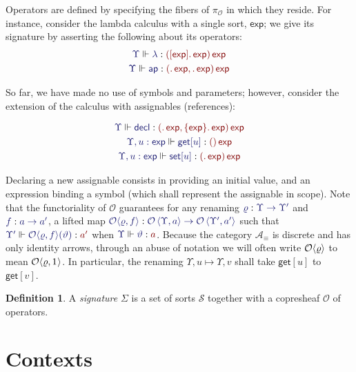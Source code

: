 \documentclass[11pt]{article}
\theoremstyle{definition}
\newtheorem{definition}[thm]{Definition}
\theoremstyle{remark}
\numberwithin{equation}{section}
\def\IModeColorName{MidnightBlue}
\def\OModeColorName{Maroon}
\newcommand\IMode[1]{{\color{\IModeColorName}{#1}}}
\newcommand\OMode[1]{{\color{\OModeColorName}{#1}}}
\newcommand\Of[2]{\IMode{#1}: \IMode{#2}}
\newcommand\MkValence[3]{%
  \ifthenelse{\equal{#1}{}}{}{%
    \{#1\}%
  }%
  \ifthenelse{\equal{#2}{}}{}{%
    [#2]%
  }.\, #3%
}
\newcommand\MkArity[2]{(#1)\, #2}
\newcommand\ArrId[1]{1_{#1}}
\newcommand\Sorts{\mathcal{S}}
\newcommand\Arities{\mathcal{A}}
\newcommand\Operators{\mathcal{O}}
\newcommand\Discrete[1]{#1_{\equiv}}
\newcommand\IsOperator[3]{\IMode{#1}\Vdash\IMode{#2}: \OMode{#3}}
\newcommand\Pair[2]{\left\langle#1, #2 \right\rangle}
\newcommand\FLift[2]{
  \Operators\langle#1%
  \ifthenelse{\equal{#2}{}}{}{, #2}\rangle%
}
\newcommand\SortExp{\mathsf{exp}}
\begin{document}
Operators are defined by specifying the fibers of $\pi_{\Operators}$ in which
they reside. For instance, consider the lambda calculus with a single sort,
$\SortExp$; we give its signature by asserting the following about its
operators:
\begin{gather*}
  \IsOperator{\Upsilon}{\lambda}{
    \MkArity{\MkValence{}{\SortExp}{\SortExp}}{\SortExp}
  }\\
  \IsOperator{\Upsilon}{\mathsf{ap}}{
    \MkArity{
      \MkValence{}{}{\SortExp},
      \MkValence{}{}{\SortExp}
    }{\SortExp}
  }
\end{gather*}

So far, we have made no use of symbols and parameters; however, consider the
extension of the calculus with assignables (references):

\begin{gather*}
  \IsOperator{\Upsilon}{\mathsf{decl}}{
    \MkArity{
      \MkValence{}{}{\SortExp},
      \MkValence{\SortExp}{}{\SortExp}
    }{
      \SortExp
    }
  }\\
  \IsOperator{\Upsilon,u:\SortExp}{\mathsf{get}[u]}{
    \MkArity{}{\SortExp}
  }\\
  \IsOperator{\Upsilon,u:\SortExp}{\mathsf{set}[u]}{
    \MkArity{
      \MkValence{}{}{\SortExp}
    }{
      \SortExp
    }
  }
\end{gather*}

Declaring a new assignable consists in providing an initial value, and an
expression binding a symbol (which shall represent the assignable in scope).
Note that the functoriality of $\Operators$ guarantees for any renaming
$\Of{\varrho}{\Upsilon\to\Upsilon'}$ and $\Of{f}{a\to a'}$, a lifted map
$\Of{\FLift{\varrho}{f}}{\Operators\Pair{\Upsilon}{a}\to\Operators\Pair{\Upsilon'}{a'}}$
such that $\IsOperator{\Upsilon'}{\FLift{\varrho}{f}(\vartheta)}{a'}$ when
$\IsOperator{\Upsilon}{\vartheta}{a}$. Because the category
$\Discrete{\Arities}$ is discrete and has only identity arrows, through an abuse
of notation we will often write $\FLift{\varrho}{}$ to mean
$\FLift{\varrho}{\ArrId{}}$. In particular, the renaming
$\Upsilon,u\mapsto\Upsilon,v$ shall take $\mathsf{get}[u]$ to $\mathsf{get}[v]$.

\begin{definition}
  A \emph{signature} $\Sigma$ is a set of sorts $\Sorts$ together with a copresheaf $\Operators$ of operators.
\end{definition}

\section{Contexts}
\end{document}

